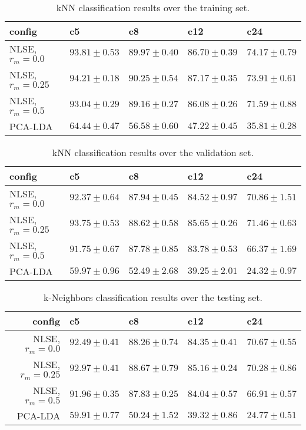 \begin{table*}[h!]
\begin{center}
\caption{kNN classification results over the training set.}
\small
\begin{tabular}{lllll}
 config  & c5    & c8   & c12  & c24  \\
\hline
 NLSE, $r_{m}=0.0$ & $93.81\pm0.53$ & $89.97\pm0.40$ & $86.70\pm0.39$ & $74.17\pm0.79$ \\
 NLSE, $r_{m}=0.25$ & $94.21\pm0.18$ & $90.25\pm0.54$ & $87.17\pm0.35$ & $73.91\pm0.61$ \\
 NLSE, $r_{m}=0.5$  & $93.04\pm0.29$ & $89.16\pm0.27$ & $86.08\pm0.26$ & $71.59\pm0.88$ \\
 \hline
 PCA-LDA & $64.44\pm0.47$ & $56.58\pm0.60$ & $47.22\pm0.45$ & $35.81\pm0.28$ \\

\hline
\end{tabular}
\label{tab:train}
\end{center}
\end{table*}

\begin{table*}[h!]
\begin{center}
\caption{kNN classification results over the validation set.}
\small
\begin{tabular}{lllll}
\hline
config & c5  & c8 & c12   & c24     \\
\hline
 NLSE, $r_{m}=0.0$  & $92.37\pm0.64$ & $87.94\pm0.45$ & $84.52\pm0.97$ & $70.86\pm1.51$ \\
 NLSE, $r_{m}=0.25$ & $93.75\pm0.53$ & $88.62\pm0.58$ & $85.65\pm0.26$ & $71.46\pm0.63$ \\
 NLSE, $r_{m}=0.5$  & $91.75\pm0.67$ & $87.78\pm0.85$ & $83.78\pm0.53$ & $66.37\pm1.69$ \\
 \hline
 PCA-LDA & $59.97\pm0.96$ & $52.49\pm2.68$ & $39.25\pm2.01$ & $24.32\pm0.97$ \\
\hline
\end{tabular}
\label{tab:valid}
\end{center}
\end{table*}

\begin{table*}[h!]
\begin{center}
\caption{k-Neighbors classification results over the testing set.}
\small
\begin{tabular}{rllll}
\hline
config & c5  & c8  & c12   & c24   \\
\hline
 NLSE, $r_{m}=0.0$  & $92.49\pm0.41$ & $88.26\pm0.74$ & $84.35\pm0.41$ & $70.67\pm0.55$ \\
 NLSE, $r_{m}=0.25$ & $92.97\pm0.41$ & $88.67\pm0.79$ & $85.16\pm0.24$ & $70.28\pm0.86$ \\
 NLSE, $r_{m}=0.5$  & $91.96\pm0.35$ & $87.83\pm0.25$ & $84.04\pm0.57$ & $66.91\pm0.57$ \\
 \hline
 PCA-LDA  & $59.91\pm0.77$ & $50.24\pm1.52$ & $39.32\pm0.86$ & $24.77\pm0.51$ \\
\hline
\end{tabular}
\label{tab:test}
\end{center}
\end{table*}



